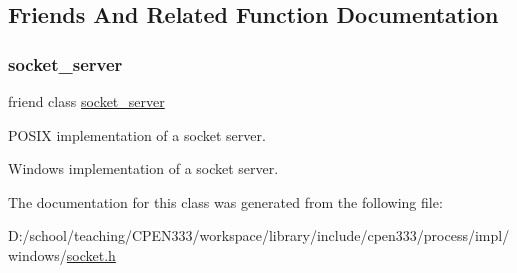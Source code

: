 \subsection{Friends And Related Function Documentation}
\mbox{\label{classcpen333_1_1process_1_1windows_1_1socket__client_aba37c0ea463da9263b0712d3b3389066}} 
\subsubsection{\texorpdfstring{socket\+\_\+server}{socket\_server}}
{\footnotesize\ttfamily friend class \hyperlink{classcpen333_1_1process_1_1windows_1_1socket__server}{socket\+\_\+server}\hspace{0.3cm}{\ttfamily [friend]}}



P\+O\+S\+IX implementation of a socket server. 

Windows implementation of a socket server. 

The documentation for this class was generated from the following file\+:\begin{DoxyCompactItemize}
\item 
D\+:/school/teaching/\+C\+P\+E\+N333/workspace/library/include/cpen333/process/impl/windows/\hyperlink{impl_2windows_2socket_8h}{socket.\+h}\end{DoxyCompactItemize}
